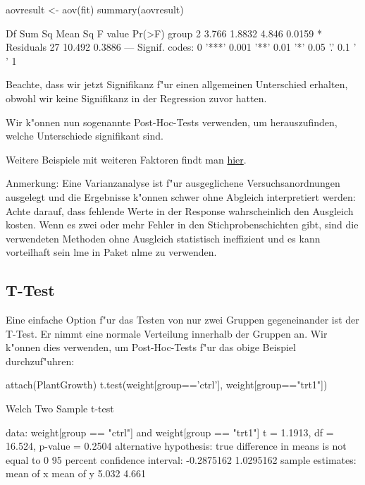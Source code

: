 \documentclass[a4paper,twoside]{tufte-book}\usepackage[]{graphicx}\usepackage[]{color}
\begin{document}
\begin{appendices}
\begin{Schunk}
\begin{Sinput}
aovresult <- aov(fit)
summary(aovresult)
\end{Sinput}
\begin{Soutput}
            Df Sum Sq Mean Sq F value Pr(>F)  
group        2  3.766  1.8832   4.846 0.0159 *
Residuals   27 10.492  0.3886                 
---
Signif. codes:  0 '***' 0.001 '**' 0.01 '*' 0.05 '.' 0.1 ' ' 1
\end{Soutput}
\end{Schunk}

Beachte, dass wir jetzt Signifikanz f"ur einen allgemeinen Unterschied erhalten, obwohl wir keine Signifikanz in der Regression zuvor hatten.

Wir k"onnen nun sogenannte Post-Hoc-Tests verwenden, um herauszufinden, welche Unterschiede signifikant sind.

Weitere Beispiele mit weiteren Faktoren findt man \href{http://www.statmethods.net/stats/anova.html}{hier}.


Anmerkung: Eine Varianzanalyse ist f"ur ausgeglichene Versuchsanordnungen ausgelegt und die Ergebnisse k"onnen schwer ohne Abgleich interpretiert werden: Achte darauf, dass fehlende Werte in der Response wahrscheinlich den Ausgleich kosten. Wenn es zwei oder mehr Fehler in den Stichprobenschichten gibt, sind die verwendeten Methoden ohne Ausgleich statistisch ineffizient und es kann vorteilhaft sein lme in Paket nlme zu verwenden.

\subsection{T-Test}

Eine einfache Option f"ur das Testen von nur zwei Gruppen gegeneinander ist der T-Test. Er nimmt eine normale Verteilung innerhalb der Gruppen an. Wir k"onnen dies verwenden, um Post-Hoc-Tests f"ur das obige Beispiel durchzuf"uhren:

\begin{Schunk}
\begin{Sinput}
attach(PlantGrowth)
t.test(weight[group=='ctrl'], weight[group=="trt1"])
\end{Sinput}
\begin{Soutput}

	Welch Two Sample t-test

data:  weight[group == "ctrl"] and weight[group == "trt1"]
t = 1.1913, df = 16.524, p-value = 0.2504
alternative hypothesis: true difference in means is not equal to 0
95 percent confidence interval:
 -0.2875162  1.0295162
sample estimates:
mean of x mean of y 
    5.032     4.661 
\end{Soutput}
\end{Schunk}


\end{appendices}
\end{document}
